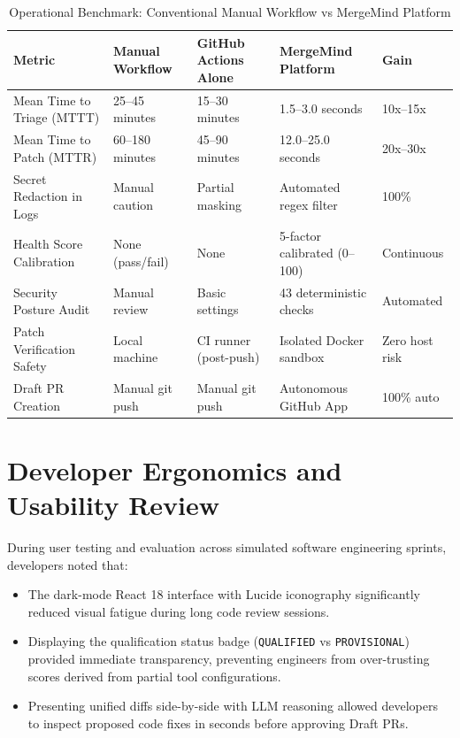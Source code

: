 \documentclass[12pt,a4paper,oneside]{report}
\begin{document}
\begin{table}[htbp]
    \centering
    \caption{Operational Benchmark: Conventional Manual Workflow vs MergeMind Platform}
    \label{tab:operational-benchmark}
    \small
    \begin{tabularx}{\textwidth}{p{} p{} p{} p{} p{}}
        \toprule
        \textbf{Metric} & \textbf{Manual Workflow} & \textbf{GitHub Actions Alone} & \textbf{MergeMind Platform} & \textbf{Gain} \\
        \midrule
        Mean Time to Triage (MTTT) & 25--45 minutes & 15--30 minutes & 1.5--3.0 seconds & 10x--15x \\
        \addlinespace
        Mean Time to Patch (MTTR) & 60--180 minutes & 45--90 minutes & 12.0--25.0 seconds & 20x--30x \\
        \addlinespace
        Secret Redaction in Logs & Manual caution & Partial masking & Automated regex filter & 100\% \\
        \addlinespace
        Health Score Calibration & None (pass/fail) & None & 5-factor calibrated (0--100) & Continuous \\
        \addlinespace
        Security Posture Audit & Manual review & Basic settings & 43 deterministic checks & Automated \\
        \addlinespace
        Patch Verification Safety & Local machine & CI runner (post-push) & Isolated Docker sandbox & Zero host risk \\
        \addlinespace
        Draft PR Creation & Manual git push & Manual git push & Autonomous GitHub App & 100\% auto \\
        \bottomrule
    \end{tabularx}
\end{table}

\section{Developer Ergonomics and Usability Review}
\label{sec:disc-usability}

During user testing and evaluation across simulated software engineering sprints, developers noted that:
\begin{itemize}
    \item The dark-mode React 18 interface with Lucide iconography significantly reduced visual fatigue during long code review sessions.
    \item Displaying the qualification status badge (\texttt{QUALIFIED} vs \texttt{PROVISIONAL}) provided immediate transparency, preventing engineers from over-trusting scores derived from partial tool configurations.
    \item Presenting unified diffs side-by-side with LLM reasoning allowed developers to inspect proposed code fixes in seconds before approving Draft PRs.
\end{itemize}
\end{document}
